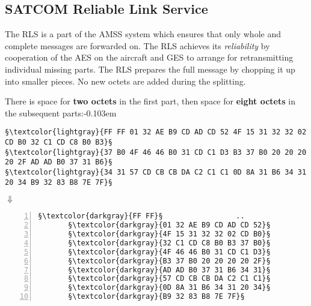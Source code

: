 \documentclass[tikz,a4paper,12pt]{article}
\begin{document}
\subsection{SATCOM Reliable Link Service}

The \gls{RLS} is a part of the \gls{AMSS} system which ensures that
only whole and complete messages are forwarded on.  The RLS achieves
its \emph{reliability} by cooperation of the \gls{AES} on the aircraft and \gls{GES}
to arrange for retransmitting individual missing parts.  The \gls{RLS}
prepares the full message by chopping it up into smaller pieces.  No
new octets are added during the splitting.

{There is space for \textbf{two octets} in the first part, then space for \textbf{eight
octets} in the subsequent parts:\unskip\parfillskip-0.103em \par}\vspace{0.5em}

\begin{lstlisting}[language=ACARS]
§\textcolor{lightgray}{FF FF 01 32 AE B9 CD AD CD 52 4F 15 31 32 32 02 CD B0 32 C1 CD C8 B0 B3}§
§\textcolor{lightgray}{37 B0 4F 46 46 B0 31 CD C1 D3 B3 37 B0 20 20 20 20 2F AD AD B0 37 31 B6}§
§\textcolor{lightgray}{34 31 57 CD CB CB DA C2 C1 C1 0D 8A 31 B6 34 31 20 34 B9 32 83 B8 7E 7F}§
\end{lstlisting}

\vspace{-0.75em}\hspace{12.3em}$\Downarrow $\hspace{8.67em}\raisebox{0.8em}{$\Downarrow $}\vspace{0.1em}
\begin{lstlisting}[language=SATCOM,numbers=left]
                         §\textcolor{darkgray}{FF FF}§                 ..
       §\textcolor{darkgray}{01 32 AE B9 CD AD CD 52}§           .2.9M-MR
       §\textcolor{darkgray}{4F 15 31 32 32 02 CD B0}§           O.122.M0
       §\textcolor{darkgray}{32 C1 CD C8 B0 B3 37 B0}§           2AMH0370
       §\textcolor{darkgray}{4F 46 46 B0 31 CD C1 D3}§           OFF01MAS
       §\textcolor{darkgray}{B3 37 B0 20 20 20 20 2F}§           370    /
       §\textcolor{darkgray}{AD AD B0 37 31 B6 34 31}§           --071641
       §\textcolor{darkgray}{57 CD CB CB DA C2 C1 C1}§           WMKKZBAA
       §\textcolor{darkgray}{0D 8A 31 B6 34 31 20 34}§           ..1641 4
       §\textcolor{darkgray}{B9 32 83 B8 7E 7F}§                 92.8..
\end{lstlisting}
\end{document}
